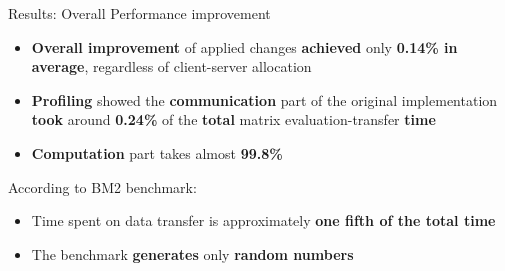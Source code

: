 \begin{frame}[t]{Results: Overall Performance improvement}
    \spc
    \justifying
    
        \begin{itemize}
            \setlength\itemsep{0.25cm}
            \item \textbf{Overall improvement} of applied changes \textbf{achieved} only \textbf{0.14\% in average}, regardless of client-server allocation
            
            \item \textbf{Profiling} showed the \textbf{communication} part of the original implementation \textbf{took} around \textbf{0.24\%} of the \textbf{total} matrix evaluation-transfer \textbf{time}
            
            \item \textbf{Computation} part takes almost \textbf{99.8\%}
        \end{itemize}
    
    \begin{block}{According to BM2 benchmark:}
        \begin{itemize}
            \item Time spent on data transfer is approximately \textbf{one fifth of the total time}
            
            \item The benchmark \textbf{generates} only \textbf{random numbers}
        \end{itemize}
    \end{block}
    
\end{frame}


